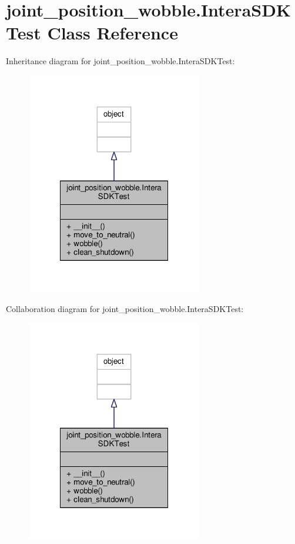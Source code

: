 \hypertarget{classjoint__position__wobble_1_1_intera_s_d_k_test}{\section{joint\-\_\-position\-\_\-wobble.\-Intera\-S\-D\-K\-Test Class Reference}
\label{classjoint__position__wobble_1_1_intera_s_d_k_test}
}


Inheritance diagram for joint\-\_\-position\-\_\-wobble.\-Intera\-S\-D\-K\-Test\-:
\nopagebreak
\begin{figure}[H]
\begin{center}
\leavevmode
\includegraphics[width=216pt]{classjoint__position__wobble_1_1_intera_s_d_k_test__inherit__graph}
\end{center}
\end{figure}


Collaboration diagram for joint\-\_\-position\-\_\-wobble.\-Intera\-S\-D\-K\-Test\-:
\nopagebreak
\begin{figure}[H]
\begin{center}
\leavevmode
\includegraphics[width=216pt]{classjoint__position__wobble_1_1_intera_s_d_k_test__coll__graph}
\end{center}
\end{figure}
